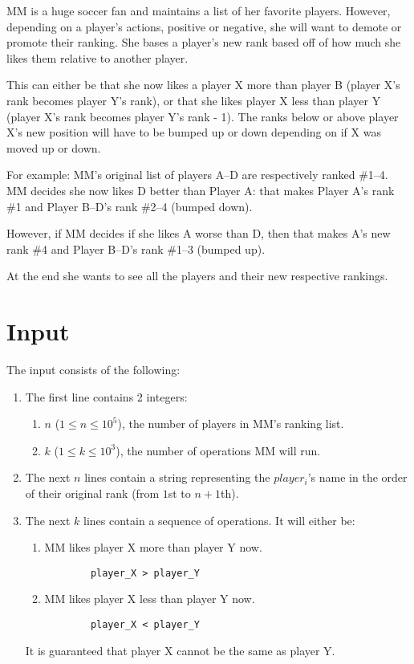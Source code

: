 
MM is a huge soccer fan and maintains a list of her favorite players. However, depending on a player's actions, positive or negative, she will want to demote or promote their ranking. She bases a player's new rank based off of how much she likes them relative to another player.

This can either be that she now likes a player X more than player B (player X's rank becomes player Y's rank), or that she likes player X less than player Y (player X's rank becomes player Y's rank - 1). The ranks below or above player X's new position will have to be bumped up or down depending on if X was moved up or down.

For example: MM's original list of players A--D are respectively ranked \#1--4. MM decides she now likes D better than Player A: that makes Player A's rank \#1 and Player B--D's rank \#2--4 (bumped down).

However, if MM decides if she likes A worse than D, then that makes A's new rank \#4 and Player B--D's rank \#1--3 (bumped up).

At the end she wants to see all the players and their new respective rankings.

\section*{Input}

The input consists of the following:

\begin{enumerate}
    \item The first line contains 2 integers: 
        \begin{enumerate}
            \item $n$ ($1 \leq n \leq 10^5$), the number of players in MM's ranking list.
            \item $k$ ($1 \leq k \leq 10^3$), the number of operations MM will run.
        \end{enumerate}
    \item The next $n$ lines contain a string representing the $player_i$'s name in the order of their original rank (from $1$st to $n+1$th).
    \item The next $k$ lines contain a sequence of operations. It will either be:
    \begin{enumerate}
        \item MM likes player X more than player Y now.
        \begin{lstlisting}
        player_X > player_Y
        \end{lstlisting}
        
        \item MM likes player X less than player Y now.
        \begin{lstlisting}
        player_X < player_Y
        \end{lstlisting}
    \end{enumerate}

    It is guaranteed that player X cannot be the same as player Y.
    
\end{enumerate}
    

